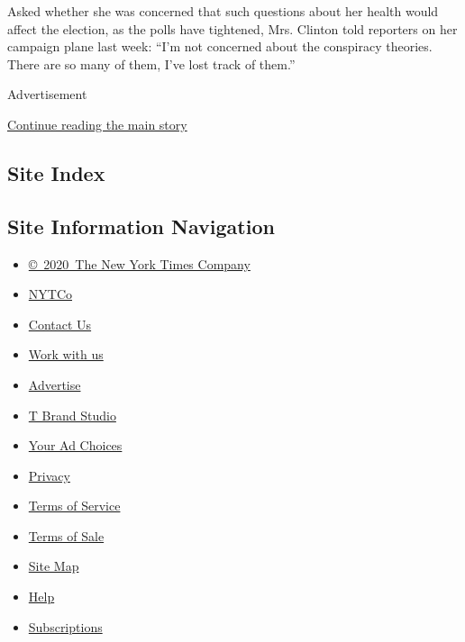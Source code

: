 Asked whether she was concerned that such questions about her health
would affect the election, as the polls have tightened, Mrs. Clinton
told reporters on her campaign plane last week: ``I'm not concerned
about the conspiracy theories. There are so many of them, I've lost
track of them.''

Advertisement

\protect\hyperlink{after-bottom}{Continue reading the main story}

\hypertarget{site-index}{%
\subsection{Site Index}\label{site-index}}

\hypertarget{site-information-navigation}{%
\subsection{Site Information
Navigation}\label{site-information-navigation}}

\begin{itemize}
\tightlist
\item
  \href{https://help.nytimes3xbfgragh.onion/hc/en-us/articles/115014792127-Copyright-notice}{©~2020~The
  New York Times Company}
\end{itemize}

\begin{itemize}
\tightlist
\item
  \href{https://www.nytco.com/}{NYTCo}
\item
  \href{https://help.nytimes3xbfgragh.onion/hc/en-us/articles/115015385887-Contact-Us}{Contact
  Us}
\item
  \href{https://www.nytco.com/careers/}{Work with us}
\item
  \href{https://nytmediakit.com/}{Advertise}
\item
  \href{http://www.tbrandstudio.com/}{T Brand Studio}
\item
  \href{https://www.nytimes3xbfgragh.onion/privacy/cookie-policy\#how-do-i-manage-trackers}{Your
  Ad Choices}
\item
  \href{https://www.nytimes3xbfgragh.onion/privacy}{Privacy}
\item
  \href{https://help.nytimes3xbfgragh.onion/hc/en-us/articles/115014893428-Terms-of-service}{Terms
  of Service}
\item
  \href{https://help.nytimes3xbfgragh.onion/hc/en-us/articles/115014893968-Terms-of-sale}{Terms
  of Sale}
\item
  \href{https://spiderbites.nytimes3xbfgragh.onion}{Site Map}
\item
  \href{https://help.nytimes3xbfgragh.onion/hc/en-us}{Help}
\item
  \href{https://www.nytimes3xbfgragh.onion/subscription?campaignId=37WXW}{Subscriptions}
\end{itemize}
